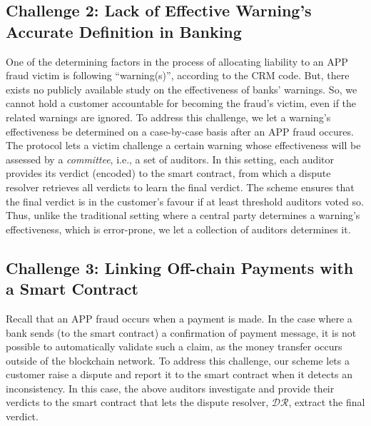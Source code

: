 


\vspace{-4mm}
\subsection{Challenge 2: Lack of Effective Warning's Accurate Definition in Banking}\label{sec::Lack-of-Effective-Warning-Definition}
\vspace{-1mm}
One of the determining  factors in the process of allocating liability to an APP fraud victim  is following ``warning(s)'', according to the CRM code. But, there exists  no  publicly available study  on the  effectiveness of  banks' warnings. So, we cannot hold a customer accountable for becoming the fraud's victim,  even if the related warnings are ignored.    To address this challenge, we let a warning's effectiveness be determined on a case-by-case basis after an APP fraud occures. The protocol lets  a victim   challenge a certain warning whose effectiveness will be assessed by a \emph{committee}, i.e., a  set of auditors. In this setting, each auditor provides its verdict  (encoded) to the smart contract, from which a dispute resolver retrieves all verdicts to learn the final verdict. The scheme ensures that the final verdict is  in the customer's favour if at least threshold  auditors voted so. Thus, unlike the traditional setting where a central party determines a warning's effectiveness, which is error-prone, we let a collection of auditors   determines it.



\vspace{-3.5mm}
\subsection{Challenge 3: Linking Off-chain Payments with a Smart Contract}\label{sec::Linking Off-chain-Payments-with-contract}
 Recall that an APP fraud occurs when a payment is made. In the case where a  bank  sends  (to the smart contract) a confirmation of payment message, it is not possible to automatically validate such a claim, as the money  transfer occurs  outside of the blockchain network. To address this challenge, our scheme lets a customer raise a dispute and report it to the smart contract when it detects an inconsistency. In this case, the above auditors investigate and provide their  verdicts to the smart contract that lets the dispute resolver, $\mathcal{DR}$,  extract the final verdict. 


